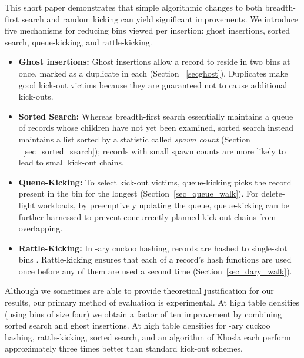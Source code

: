 \documentclass{sig-alternate-05-2015}
\begin{document}
This short paper demonstrates that simple algorithmic changes to both
breadth-first search and random kicking can yield significant
improvements. We introduce five mechanisms for reducing bins viewed
per insertion: ghost insertions, sorted search, queue-kicking, and
rattle-kicking.

\begin{itemize}
\item \textbf{Ghost insertions: }Ghost insertions allow a record to
  reside in two bins at once, marked as a duplicate in each (Section
 ~\ref{secghost}). Duplicates make good kick-out victims because they
  are guaranteed not to cause additional kick-outs.

\item \textbf{Sorted Search: }Whereas breadth-first search essentially
  maintains a queue of records whose children have not yet been
  examined, sorted search instead maintains a list sorted by a
  statistic called \emph{spawn count} (Section
 ~\ref{sec_sorted_search}); records with small spawn counts are more
  likely to lead to small kick-out chains.

\item \textbf{Queue-Kicking:} To select kick-out victims,
  queue-kicking picks the record present in the bin for the longest
  (Section~\ref{sec_queue_walk}). For delete-light workloads, by
  preemptively updating the queue, queue-kicking can be further
  harnessed to prevent concurrently planned kick-out chains from
  overlapping.

\item \textbf{Rattle-Kicking: }In -ary cuckoo hashing, records are
  hashed to  single-slot bins \cite{dary}. Rattle-kicking ensures
  that each of a record's hash functions are used once before any of them
  are used a second time (Section~\ref{sec_dary_walk}).
\end{itemize}

Although we sometimes are able to provide theoretical justification
for our results, our primary method of evaluation is experimental. At
high table densities (using bins of size four) we obtain a factor of
ten improvement by combining sorted search and ghost insertions. At
high table densities for -ary cuckoo hashing, rattle-kicking,
sorted search, and an algorithm of Khosla \cite{khosla13} each perform
approximately three times better than standard kick-out schemes.
\end{document}
